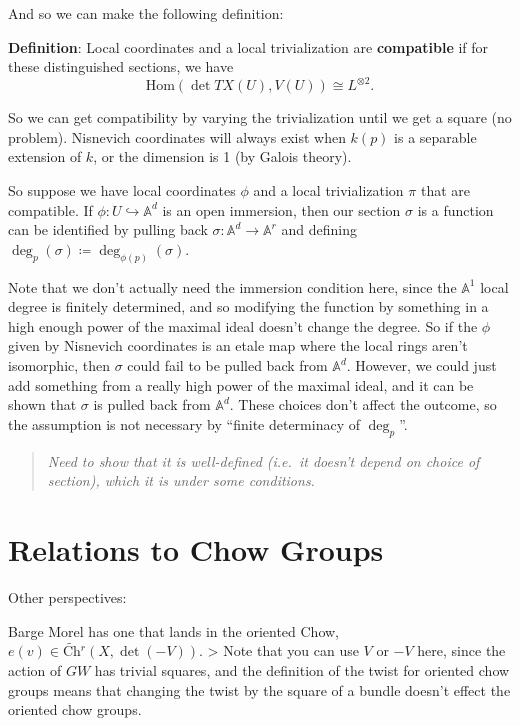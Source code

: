 \documentclass[11pt]{scrreprt}
\theoremstyle{definition}
\newcommand{\Af}[0]{{\mathbb{A}}}
\newcommand{\tensor}[0]{\otimes}
\newcommand{\definedas}[0]{\coloneqq}
\newcommand{\injects}[0]{\hookrightarrow}
\renewcommand{\hom}[0]{\text{Hom}}
\begin{document}
And so we can make the following definition:

\textbf{Definition}: Local coordinates and a local trivialization are
\textbf{compatible} if for these distinguished sections, we have \[
\hom(\det TX(U), V(U)) \cong L^{\tensor 2}.
\]

So we can get compatibility by varying the trivialization until we get a
square (no problem). Nisnevich coordinates will always exist when
\(k(p)\) is a separable extension of \(k\), or the dimension is 1 (by
Galois theory).

So suppose we have local coordinates \(\phi\) and a local trivialization
\(\pi\) that are compatible. If \(\phi: U \injects \Af^d\) is an open
immersion, then our section \(\sigma\) is a function can be identified
by pulling back \(\sigma: \Af^d \to \Af^r\) and defining
\(\deg_p(\sigma) \definedas \deg_{\phi(p)}(\sigma)\).

Note that we don't actually need the immersion condition here, since the
\(\Af^1\) local degree is finitely determined, and so modifying the
function by something in a high enough power of the maximal ideal
doesn't change the degree. So if the \(\phi\) given by Nisnevich
coordinates is an etale map where the local rings aren't isomorphic,
then \(\sigma\) could fail to be pulled back from \(\Af^d\). However, we
could just add something from a really high power of the maximal ideal,
and it can be shown that \(\sigma\) is pulled back from \(\Af^d\). These
choices don't affect the outcome, so the assumption is not necessary by
``finite determinacy of \(\deg_p\)''.

\begin{quote}\textit{
Need to show that it is well-defined (i.e.~it doesn't depend on choice
of section), which it is under some conditions.
}\end{quote}

\hypertarget{relations-to-chow-groups}{%
\section{Relations to Chow Groups}\label{relations-to-chow-groups}}

Other perspectives:

Barge Morel has one that lands in the oriented Chow,
\(e(v) \in \widetilde{\text{Ch}}{}^r(X, \det (-V))\). \textgreater{}
Note that you can use \(V\) or \(-V\) here, since the action of \(GW\)
has trivial squares, and the definition of the twist for oriented chow
groups means that changing the twist by the square of a bundle doesn't
effect the oriented chow groups.
\end{document}
